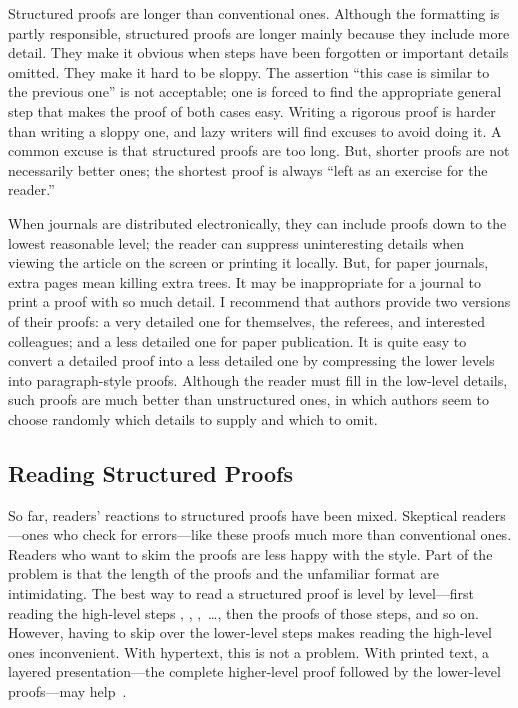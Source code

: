 Structured proofs are longer than conventional ones.  Although the
formatting is partly responsible, structured proofs are longer mainly
because they include more detail.  They make it obvious when steps
have been forgotten or important details omitted.  They make it hard to
be sloppy.  The assertion ``this case is similar to the previous one''
is not acceptable; one is forced to find the appropriate
general step that makes the proof of both cases easy.  Writing a
rigorous proof is harder than writing a sloppy one, and lazy writers
will find excuses to avoid doing it.  A common excuse is that
structured proofs are too long.  But, shorter proofs are not
necessarily better ones; the shortest proof is always ``left as an
exercise for the reader.''

When journals are distributed electronically, they can include proofs
down to the lowest reasonable level; the reader can suppress
uninteresting details when viewing the article on the screen or
printing it locally.  But, for paper journals, extra pages mean
killing extra trees.  It may be inappropriate for a journal to print a
proof with so much detail.  I recommend that authors provide two
versions of their proofs: a very detailed one for themselves, the
referees, and interested colleagues; and a less detailed one for paper
publication.  It is quite easy to convert a detailed proof into a less
detailed one by compressing the lower levels into paragraph-style
proofs.  Although the reader must fill in the low-level details, such
proofs are much better than unstructured ones, in which authors seem
to choose randomly which details to supply and which to omit.

\subsection{Reading Structured Proofs} 

So far, readers' reactions to structured proofs have been mixed.
Skeptical readers---ones who check for errors---like these proofs much
more than conventional ones.  Readers who want to skim the proofs are
less happy with the style.  Part of the problem is that the length of
the proofs and the unfamiliar format are intimidating.  The best way
to read a structured proof is level by level---first reading the
high-level steps , ,
,~\ldots, then the proofs of those steps, and so
on.  However, having to skip over the lower-level steps makes reading
the high-level ones inconvenient.  With hypertext, this is not a
problem.  With printed text, a layered presentation---the complete
higher-level proof followed by the lower-level proofs---may
help~\cite[section B.7~(page~48)]{abadi:old-fashioned-src}.

